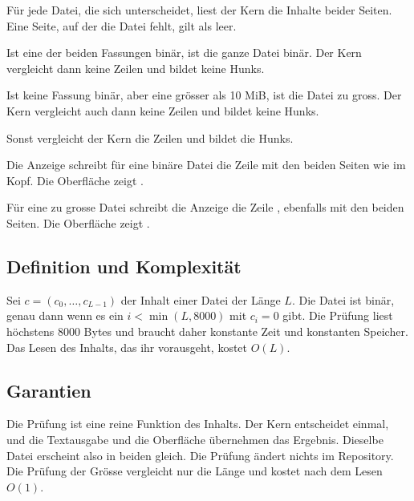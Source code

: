 \startitemize[n]
\item Für jede Datei, die sich unterscheidet, liest der Kern die Inhalte beider Seiten. Eine
Seite, auf der die Datei fehlt, gilt als leer.
\item Ist eine der beiden Fassungen binär, ist die ganze Datei binär. Der Kern vergleicht dann
keine Zeilen und bildet keine Hunks.
\item Ist keine Fassung binär, aber eine grösser als 10 MiB, ist die Datei zu gross. Der Kern
vergleicht auch dann keine Zeilen und bildet keine Hunks.
\item Sonst vergleicht der Kern die Zeilen und bildet die Hunks.
\item Die Anzeige schreibt für eine binäre Datei die Zeile 
mit den beiden Seiten wie im Kopf. Die Oberfläche zeigt .
\item Für eine zu grosse Datei schreibt die Anzeige die Zeile
, ebenfalls mit den beiden Seiten.
Die Oberfläche zeigt .
\stopitemize

\subsection{Definition und Komplexität}

Sei $c = (c_0, \dots, c_{L-1})$ der Inhalt einer Datei der Länge $L$. Die Datei ist binär, genau
dann wenn es ein $i < \min(L, 8000)$ mit $c_i = 0$ gibt. Die Prüfung liest höchstens 8000 Bytes
und braucht daher konstante Zeit und konstanten Speicher. Das Lesen des Inhalts, das ihr
vorausgeht, kostet $O(L)$.

\subsection{Garantien}

Die Prüfung ist eine reine Funktion des Inhalts. Der Kern entscheidet einmal, und die Textausgabe
und die Oberfläche übernehmen das Ergebnis. Dieselbe Datei erscheint also in beiden gleich. Die
Prüfung ändert nichts im Repository.
Die Prüfung der Grösse vergleicht nur die Länge und kostet nach dem Lesen $O(1)$.

